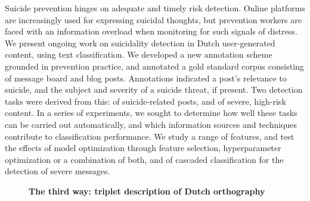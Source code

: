 \documentclass[10pt, a4paper, twopage, headinclude, footinclude, BCOR5mm]{scrartcl}
\begin{document}
\noindent
Suicide prevention hinges on adequate and timely risk detection. Online platforms are increasingly used for expressing suicidal thoughts, but prevention workers are faced with an information overload when monitoring for such signals of distress. We present ongoing work on suicidality detection in Dutch user-generated content, using text classification.  We developed a new annotation scheme grounded in prevention practice, and annotated a gold standard corpus consisting of message board and blog posts. Annotations indicated a post's relevance to suicide, and the subject and severity of a suicide threat, if present. Two detection tasks were derived from this: of suicide-related posts, and of severe, high-risk content.  In a series of experiments, we sought to determine how well these tasks can be carried out automatically, and which information sources and techniques contribute to classification performance. We study a range of features, and test the effects of model optimization through feature selection, hyperparameter optimization or a combination of both, and of cascaded classification for the detection of severe messages.


\newpage

\begin{figure}[t!]
\centering
\large\textbf{The third way: triplet description of Dutch orthography}
\vspace*{0.5cm}
\end{figure}


        \begin{table}[t!]
    \end{table}
\end{document}
